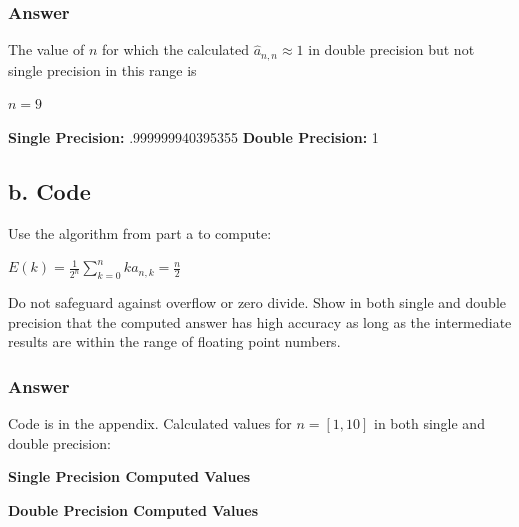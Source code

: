 \documentclass{article}
\newcommand{\n}{\newline}
\begin{document}
	\subsubsection{Answer}
	
	The value of $n$ for which the calculated $\hat{a}_{n,n}\approx1$ in double precision but not single precision in this range is \n
	
	$n=9$\n
	\begin{flushleft}
		\textbf{Single Precision: }.999999940395355\n
		\textbf{Double Precision: }1\n
	\end{flushleft}
	
	\subsection{b.  Code}
	Use the algorithm from part a to compute:\n
	
	\begin{flushleft}
		\begin{math}
		E(k)=\frac{1}{2^{n}}\sum^{n}_{k=0}ka_{n,k}=\frac{n}{2}
		\end{math}
	\end{flushleft}
	Do not safeguard against overflow or zero divide.  Show in both single and double precision that the computed answer has high accuracy as long as the intermediate results are within the range of floating point numbers.
	
	\subsubsection{Answer}
	Code is in the appendix.  Calculated values for $n=[1,10]$ in both single and double precision:
	
	\begin{center}
		\textbf{Single Precision Computed Values\n}
	\end{center}
	

	\begin{center}
		\textbf{Double Precision Computed Values\n}
	\end{center}
	
\end{document}
